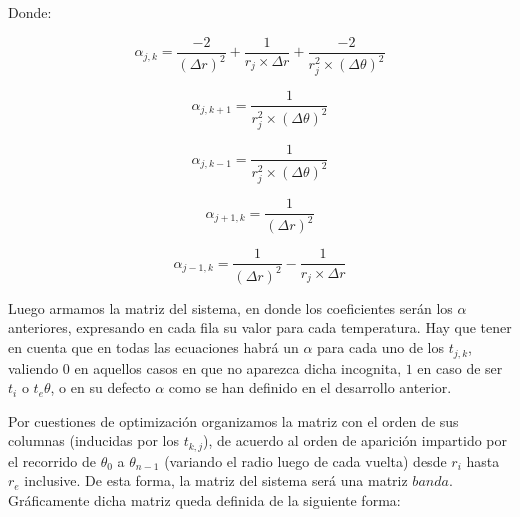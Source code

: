 Donde:

\begin{equation}
\alpha_{j,k} = \frac{-2}{(\Delta r)^2} + \frac{1}{r_j \times \Delta r} + \frac{-2}{r_j^2 \times (\Delta \theta)^2}
\end{equation}

\begin{equation}
\alpha_{j,k+1} = \frac{1}{r_j^2 \times (\Delta \theta)^2}
\end{equation}

\begin{equation}
\alpha_{j,k-1} = \frac{1}{r_j^2 \times (\Delta \theta)^2}
\end{equation}

\begin{equation}
\alpha_{j+1,k} = \frac{1}{(\Delta r)^2}
\end{equation}

\begin{equation}
\alpha_{j-1,k} = \frac{1}{(\Delta r)^2} - \frac{1}{r_j \times \Delta r}
\end{equation}

\vspace{5mm}

Luego armamos la matriz del sistema, en donde los coeficientes ser\'an los $\alpha$ anteriores, expresando en cada fila su valor para cada temperatura. Hay que tener en cuenta que en todas las ecuaciones habr\'a un $\alpha$ para cada uno de los $t_{j,k}$, valiendo $0$ en aquellos casos en que no aparezca dicha incognita, $1$ en caso de ser $t_i$ o $t_e{\theta}$, o en su defecto $\alpha$ como se han definido en el desarrollo anterior.

Por cuestiones de optimizaci\'on organizamos la matriz con el orden de sus columnas (inducidas por los $t_{k,j}$), de acuerdo al orden de aparici\'on impartido por el recorrido de $\theta_0$ a $\theta_{n-1}$ (variando el radio luego de cada vuelta) desde $r_i$ hasta $r_e$ inclusive. De esta forma, la matriz del sistema ser\'a una matriz $banda$.
\\
Gráficamente dicha matriz queda definida de la siguiente forma:
\\

